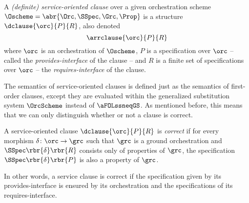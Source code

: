 \documentclass{LMCS}
\begin{document}
  \begin{defi}
    A \emph{(definite) service-oriented clause} over a given orchestration scheme \(\Oscheme = \abr{\Orc, \SSpec, \Grc, \Prop}\) is a structure \(\dclause{\orc}{P}{R}\), also denoted
    \[
    \arrclause{\orc}{P}{R}
    \]
    where \(\orc\) is an orchestration of \(\Oscheme\), \(P\) is a specification over \(\orc\) -- called the \emph{provides-interface} of the clause -- and \(R\) is a finite set of specifications over \(\orc\) -- the \emph{requires-interface} of the clause.
  \end{defi}

  The semantics of service-oriented clauses is defined just as the semantics of first-order clauses, except they are evaluated within the generalized substitution system \(\OrcScheme\) instead of \(\aFOLssneqGS\).
  As mentioned before, this means that we can only distinguish whether or not a clause is correct.

  \begin{defi}
    A service-oriented clause \(\dclause{\orc}{P}{R}\) is \emph{correct} if for every morphism \(\delta \colon \orc \to \grc\) such that \(\grc\) is a ground orchestration and \(\SSpec\rbr{\delta}\rbr{R}\) consists only of properties of \(\grc\), the specification \(\SSpec\rbr{\delta}\rbr{P}\) is also a property of \(\grc\).
  \end{defi}

  \noindent In other words, a service clause is correct if the specification given by its provides-interface is ensured by its orchestration and the specifications of its requires-interface.
\end{document}
